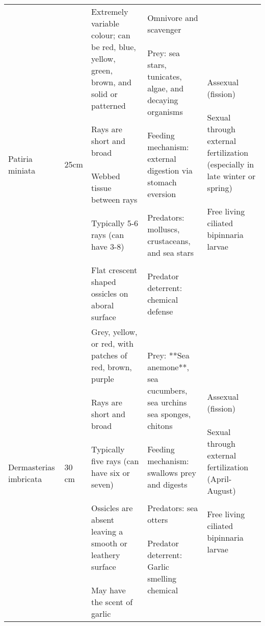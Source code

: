 \documentclass[]{article}
\begin{document}
\begin{tabular}{lllll}
Patiria miniata & 25cm & \makecell[r]{Extremely variable colour; can be red, blue, yellow, green, brown, and solid or patterned\\\\Rays are short and broad \\\\Webbed tissue between rays\\\\Typically 5-6 rays (can have 3-8)\\\\Flat crescent shaped ossicles on aboral surface} & \makecell[r]{Omnivore and scavenger\\\\Prey: sea stars, tunicates, algae, and decaying organisms\\\\Feeding mechanism: external digestion via stomach eversion\\\\Predators: molluscs, crustaceans, and sea stars\\\\Predator deterrent: chemical defense} & \makecell[r]{Assexual (fission)\\\\Sexual through external fertilization (especially in late winter or spring)\\\\Free living ciliated bipinnaria larvae}\\
Dermasterias imbricata & 30 cm & \makecell[l]{Grey, yellow, or red, with patches of red, brown, purple\\\\Rays are short and broad\\\\Typically five rays (can have six or seven)\\\\Ossicles are absent leaving a smooth or leathery surface\\\\May have the scent of garlic} & \makecell[l]{Prey: **Sea anemone**, sea cucumbers, sea urchins sea sponges, chitons\\\\Feeding mechanism: swallows prey and digests\\\\Predators: sea otters\\\\Predator deterrent: Garlic smelling chemical} & \makecell[l]{Assexual (fission)\\\\Sexual through external fertilization (April-August)\\\\Free living ciliated bipinnaria larvae}\\
\bottomrule
\end{tabular}
\end{document}
